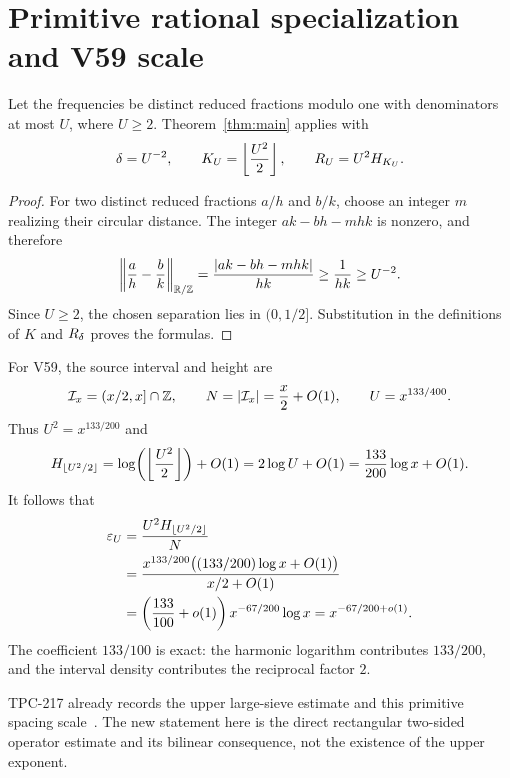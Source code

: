 \section{Primitive rational specialization and V59 scale}\label{sec:primitive}

\begin{corollary}\label{cor:primitive}
Let the frequencies be distinct reduced fractions modulo one with
denominators at most $U$, where $U\geq2$.  Theorem~\ref{thm:main} applies with
\[
\delta=U^{-2},\qquad
K_U=\left\lfloor\frac{U^2}{2}\right\rfloor,
\qquad
R_U=U^2H_{K_U}.
\]
\end{corollary}

\begin{proof}
For two distinct reduced fractions $a/h$ and $b/k$, choose an integer $m$
realizing their circular distance.  The integer $ak-bh-mhk$ is nonzero, and
therefore
\[
\left\lVert \frac ah-\frac bk\right\rVert_{\mathbb{R}/\mathbb{Z}}
=\frac{\left\lvert ak-bh-mhk\right\rvert}{hk}
\geq\frac1{hk}\geq U^{-2}.
\]
Since $U\geq2$, the chosen separation lies in $(0,1/2]$.  Substitution in the
definitions of $K$ and $R_{\delta}$ proves the formulas.
\end{proof}

For V59, the source interval and height are
\[
\mathcal{I}_x=(x/2,x]\cap\mathbb Z,\qquad
N=\left\lvert \mathcal{I}_x\right\rvert=\frac{x}{2}+O(1),\qquad
U=x^{133/400}.
\]
Thus $U^2=x^{133/200}$ and
\[
H_{\lfloor U^2/2\rfloor}
=\log\!\left(\left\lfloor\frac{U^2}{2}\right\rfloor\right)+O(1)
=2\log U+O(1)
=\frac{133}{200}\log x+O(1).
\]
\EndAccSupp{}
It follows that
\[
\begin{aligned}
\varepsilon_U
&=\frac{U^2H_{\lfloor U^2/2\rfloor}}{N}\\
&=\frac{x^{133/200}\bigl((133/200)\log x+O(1)\bigr)}{x/2+O(1)}\\
&=\left(\frac{133}{100}+o(1)\right)x^{-67/200}\log x
=x^{-67/200+o(1)}.
\end{aligned}
\]
\EndAccSupp{}
The coefficient $133/100$ is exact: the harmonic logarithm contributes
$133/200$, and the interval density contributes the reciprocal factor $2$.

TPC-217 already records the upper large-sieve estimate and this primitive
spacing scale~\cite{WangTPC217}.  The new statement here is the direct
rectangular two-sided operator estimate and its bilinear consequence, not the
existence of the upper exponent.
